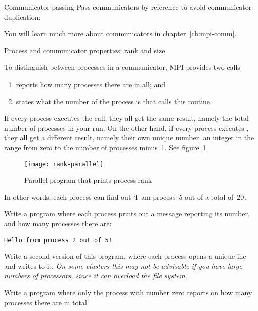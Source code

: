 \begin{mplnote}{Communicator passing}
  Pass communicators by reference to avoid communicator duplication:
\end{mplnote}

You will
learn much more about communicators in chapter~\ref{ch:mpi-comm}.

 {Process and communicator properties: rank and size}

To distinguish between processes in a communicator, MPI provides two calls
\begin{enumerate}
\item {} reports how many processes there are in all; and
\item {} states what the number of the
  process is that calls this routine.
\end{enumerate}

If every process executes the  call, they all get the
same result, namely the total number of processes in your run.
%
On the
other hand, if every process executes , they all get
a different result, namely their own unique number, an integer in the
range from zero to the number of processes minus~1.
See figure~\ref{fig:rank-parallel}.
%
\begin{figure}[ht]
  \texttt{[image: rank-parallel]}
  \caption{Parallel program that prints process rank}
  \label{fig:rank-parallel}
\end{figure}
%
In other words, each process can find out `I~am process~5
out of a total of~20'.


\begin{exercise}
  \label{ex:hello3}
  Write a program where each process prints out a message
  reporting its number, and how many processes there are:
\begin{verbatim}
Hello from process 2 out of 5!
\end{verbatim}

  Write a second version of this program, where each process opens a
  unique file and writes to it. \emph{On some clusters this may not be
    advisable if you have large numbers of processors, since it can
    overload the file system.}
\end{exercise}
\begin{exercise}
  \label{ex:hello4}
  Write a program where only the process with number zero
  reports on how many processes there are in total.
\end{exercise}

